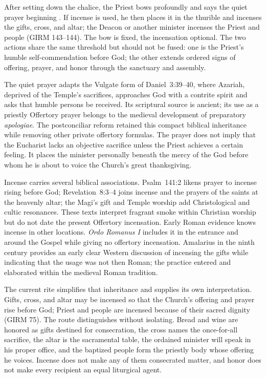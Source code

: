 
After setting down the chalice, the Priest bows profoundly and says the quiet prayer beginning . If incense is used, he then places it in the thurible and incenses the gifts, cross, and altar; the Deacon or another minister incenses the Priest and people (GIRM 143--144). The bow is fixed, the incensation optional. The two actions share the same threshold but should not be fused: one is the Priest's humble self-commendation before God; the other extends ordered signs of offering, prayer, and honor through the sanctuary and assembly.

The quiet prayer adapts the Vulgate form of Daniel~3:39--40, where Azariah, deprived of the Temple's sacrifices, approaches God with a contrite spirit and asks that humble persons be received. Its scriptural source is ancient; its use as a priestly Offertory prayer belongs to the medieval development of preparatory \emph{apologiae}. The postconciliar reform retained this compact biblical inheritance while removing other private offertory formulas. The prayer does not imply that the Eucharist lacks an objective sacrifice unless the Priest achieves a certain feeling. It places the minister personally beneath the mercy of the God before whom he is about to voice the Church's great thanksgiving.

Incense carries several biblical associations. Psalm~141:2 likens prayer to incense rising before God; Revelation~8:3--4 joins incense and the prayers of the saints at the heavenly altar; the Magi's gift and Temple worship add Christological and cultic resonances. These texts interpret fragrant smoke within Christian worship but do not date the present Offertory incensation. Early Roman evidence knows incense in other locations. \emph{Ordo Romanus I} includes it in the entrance and around the Gospel while giving no offertory incensation. Amalarius in the ninth century provides an early clear Western discussion of incensing the gifts while indicating that the usage was not then Roman; the practice entered and elaborated within the medieval Roman tradition.

The current rite simplifies that inheritance and supplies its own interpretation. Gifts, cross, and altar may be incensed so that the Church's offering and prayer rise before God; Priest and people are incensed because of their sacred dignity (GIRM 75). The route distinguishes without isolating. Bread and wine are honored as gifts destined for consecration, the cross names the once-for-all sacrifice, the altar is the sacramental table, the ordained minister will speak in his proper office, and the baptized people form the priestly body whose offering he voices. Incense does not make any of them consecrated matter, and honor does not make every recipient an equal liturgical agent.

